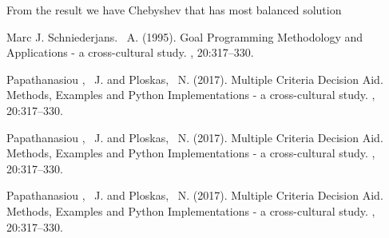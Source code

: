 \documentclass[twoside,twocolumn]{article}
\begin{document}
From the result we have Chebyshev that has most balanced solution
\pagebreak
\begin{thebibliography}{99} %
 
Marc J. Schniederjans. ~A. (1995).
\newblock Goal Programming Methodology and Applications - a cross-cultural
  study.
, 20:317--330.


Papathanasiou , ~J. and Ploskas, ~N. (2017).
\newblock Multiple Criteria Decision Aid. Methods, Examples and Python Implementations - a cross-cultural
  study.
, 20:317--330.


Papathanasiou , ~J. and Ploskas, ~N. (2017).
\newblock Multiple Criteria Decision Aid. Methods, Examples and Python Implementations - a cross-cultural
  study.
, 20:317--330.

Papathanasiou , ~J. and Ploskas, ~N. (2017).
\newblock Multiple Criteria Decision Aid. Methods, Examples and Python Implementations - a cross-cultural
  study.
, 20:317--330.

\end{thebibliography}

\end{document}
